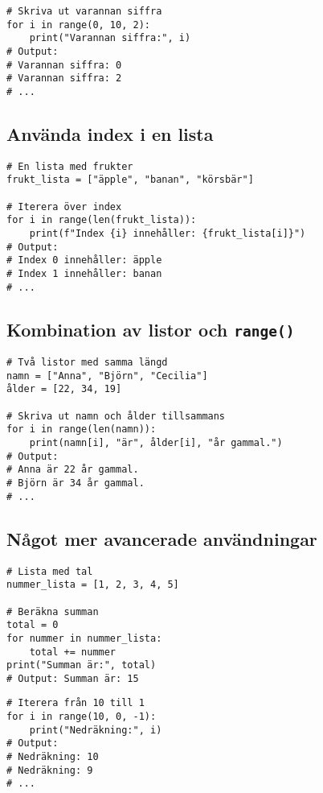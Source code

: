 \begin{lstlisting}[title=Exempel 6: Iterera med steg]
# Skriva ut varannan siffra
for i in range(0, 10, 2):
    print("Varannan siffra:", i)
# Output:
# Varannan siffra: 0
# Varannan siffra: 2
# ...
\end{lstlisting}

\subsection*{Använda index i en lista}

\begin{lstlisting}[title=Exempel 7: Iterera över index med range()]
# En lista med frukter
frukt_lista = ["äpple", "banan", "körsbär"]

# Iterera över index
for i in range(len(frukt_lista)):
    print(f"Index {i} innehåller: {frukt_lista[i]}")
# Output:
# Index 0 innehåller: äpple
# Index 1 innehåller: banan
# ...
\end{lstlisting}

\subsection*{Kombination av listor och \texttt{range()}}

\begin{lstlisting}[title=Exempel 8: Kombinera med flera listor]
# Två listor med samma längd
namn = ["Anna", "Björn", "Cecilia"]
ålder = [22, 34, 19]

# Skriva ut namn och ålder tillsammans
for i in range(len(namn)):
    print(namn[i], "är", ålder[i], "år gammal.")
# Output:
# Anna är 22 år gammal.
# Björn är 34 år gammal.
# ...
\end{lstlisting}

\subsection*{Något mer avancerade användningar}

\begin{lstlisting}[title=Exempel 9: Summera tal i en lista]
# Lista med tal
nummer_lista = [1, 2, 3, 4, 5]

# Beräkna summan
total = 0
for nummer in nummer_lista:
    total += nummer
print("Summan är:", total)
# Output: Summan är: 15
\end{lstlisting}

\begin{lstlisting}[title=Exempel 10: Skriva ut omvänt med negativt steg]
# Iterera från 10 till 1
for i in range(10, 0, -1):
    print("Nedräkning:", i)
# Output:
# Nedräkning: 10
# Nedräkning: 9
# ...
\end{lstlisting}
